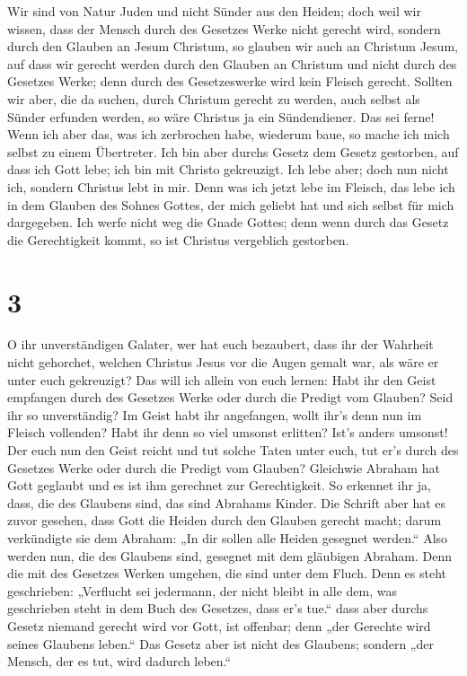  Wir sind von Natur Juden und nicht Sünder aus den
Heiden;  doch weil wir wissen, dass der Mensch durch des
Gesetzes Werke nicht gerecht wird, sondern durch den Glauben an Jesum
Christum, so glauben wir auch an Christum Jesum, auf dass wir gerecht
werden durch den Glauben an Christum und nicht durch des Gesetzes Werke;
denn durch des Gesetzeswerke wird kein Fleisch gerecht. 
Sollten wir aber, die da suchen, durch Christum gerecht zu werden, auch
selbst als Sünder erfunden werden, so wäre Christus ja ein Sündendiener.
Das sei ferne!  Wenn ich aber das, was ich zerbrochen
habe, wiederum baue, so mache ich mich selbst zu einem Übertreter.
 Ich bin aber durchs Gesetz dem Gesetz gestorben, auf
dass ich Gott lebe; ich bin mit Christo gekreuzigt.  Ich
lebe aber; doch nun nicht ich, sondern Christus lebt in mir. Denn was
ich jetzt lebe im Fleisch, das lebe ich in dem Glauben des Sohnes
Gottes, der mich geliebt hat und sich selbst für mich dargegeben.
 Ich werfe nicht weg die Gnade Gottes; denn wenn durch
das Gesetz die Gerechtigkeit kommt, so ist Christus vergeblich
gestorben.

\hypertarget{section-2}{%
\section{3}\label{section-2}}

 O ihr unverständigen Galater, wer hat euch bezaubert,
dass ihr der Wahrheit nicht gehorchet, welchen Christus Jesus vor die
Augen gemalt war, als wäre er unter euch gekreuzigt?  Das
will ich allein von euch lernen: Habt ihr den Geist empfangen durch des
Gesetzes Werke oder durch die Predigt vom Glauben?  Seid
ihr so unverständig? Im Geist habt ihr angefangen, wollt ihr's denn nun
im Fleisch vollenden?  Habt ihr denn so viel umsonst
erlitten? Ist's anders umsonst!  Der euch nun den Geist
reicht und tut solche Taten unter euch, tut er's durch des Gesetzes
Werke oder durch die Predigt vom Glauben?  Gleichwie
Abraham hat Gott geglaubt und es ist ihm gerechnet zur Gerechtigkeit.
 So erkennet ihr ja, dass, die des Glaubens sind, das sind
Abrahams Kinder.  Die Schrift aber hat es zuvor gesehen,
dass Gott die Heiden durch den Glauben gerecht macht; darum verkündigte
sie dem Abraham: „In dir sollen alle Heiden gesegnet werden.``
 Also werden nun, die des Glaubens sind, gesegnet mit dem
gläubigen Abraham.  Denn die mit des Gesetzes Werken
umgehen, die sind unter dem Fluch. Denn es steht geschrieben: „Verflucht
sei jedermann, der nicht bleibt in alle dem, was geschrieben steht in
dem Buch des Gesetzes, dass er's tue.``  dass aber durchs
Gesetz niemand gerecht wird vor Gott, ist offenbar; denn „der Gerechte
wird seines Glaubens leben.``  Das Gesetz aber ist nicht
des Glaubens; sondern „der Mensch, der es tut, wird dadurch leben.``

